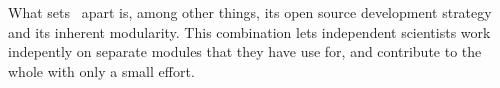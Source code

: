 What sets \MCX\ apart is, among other things, its open source
development strategy and its inherent modularity. 
This combination lets independent scientists work indepently on separate
modules that they have use for, and contribute to the whole with only a small
effort.  


%
%
%

